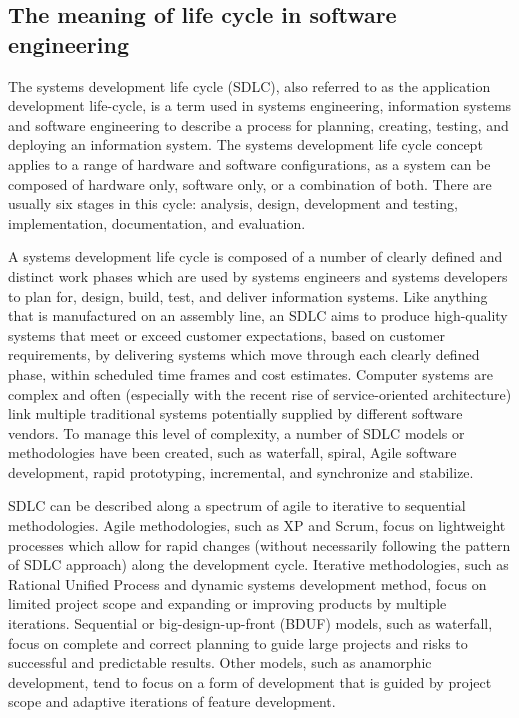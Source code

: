 \documentclass[a4paper]{report}
\begin{document}
\subsection{The meaning of life cycle in software engineering}
The systems development life cycle (SDLC), also referred to as the application development life-cycle, is a term used in systems engineering, information systems and software engineering to describe a process for planning, creating, testing, and deploying an information system. The systems development life cycle concept applies to a range of hardware and software configurations, as a system can be composed of hardware only, software only, or a combination of both. There are usually six stages in this cycle: analysis, design, development and testing, implementation, documentation, and evaluation.
\par
A systems development life cycle is composed of a number of clearly defined and distinct work phases which are used by systems engineers and systems developers to plan for, design, build, test, and deliver information systems. Like anything that is manufactured on an assembly line, an SDLC aims to produce high-quality systems that meet or exceed customer expectations, based on customer requirements, by delivering systems which move through each clearly defined phase, within scheduled time frames and cost estimates. Computer systems are complex and often (especially with the recent rise of service-oriented architecture) link multiple traditional systems potentially supplied by different software vendors. To manage this level of complexity, a number of SDLC models or methodologies have been created, such as waterfall, spiral, Agile software development, rapid prototyping, incremental, and synchronize and stabilize.
\par
SDLC can be described along a spectrum of agile to iterative to sequential methodologies. Agile methodologies, such as XP and Scrum, focus on lightweight processes which allow for rapid changes (without necessarily following the pattern of SDLC approach) along the development cycle. Iterative methodologies, such as Rational Unified Process and dynamic systems development method, focus on limited project scope and expanding or improving products by multiple iterations. Sequential or big-design-up-front (BDUF) models, such as waterfall, focus on complete and correct planning to guide large projects and risks to successful and predictable results. Other models, such as anamorphic development, tend to focus on a form of development that is guided by project scope and adaptive iterations of feature development.
\end{document}
